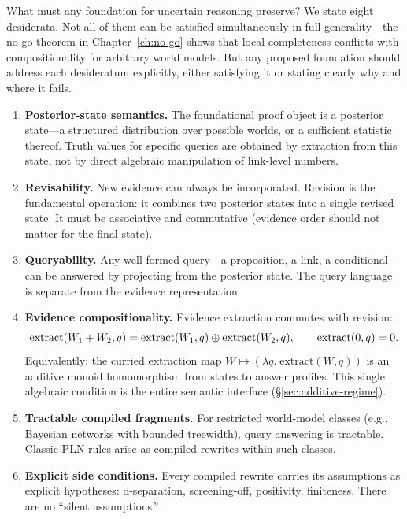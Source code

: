 \documentclass[11pt,openany]{report}
\begin{document}
What must any foundation for uncertain reasoning preserve?  We state
eight desiderata.  Not all of them can be satisfied simultaneously in
full generality---the no-go theorem in Chapter~\ref{ch:no-go} shows
that local completeness conflicts with compositionality for arbitrary
world models.  But any proposed foundation should address each
desideratum explicitly, either satisfying it or stating clearly why and
where it fails.

\begin{enumerate}
\item \textbf{Posterior-state semantics.}  The foundational proof
  object is a posterior state---a structured distribution over possible
  worlds, or a sufficient statistic thereof.  Truth values for specific
  queries are obtained by extraction from this state, not by direct
  algebraic manipulation of link-level numbers.

\item \textbf{Revisability.}  New evidence can always be incorporated.
  Revision is the fundamental operation: it combines two posterior
  states into a single revised state.  It must be associative and
  commutative (evidence order should not matter for the final state).

\item \textbf{Queryability.}  Any well-formed query---a proposition, a
  link, a conditional---can be answered by projecting from the
  posterior state.  The query language is separate from the evidence
  representation.

\item \textbf{Evidence compositionality.}  Evidence extraction commutes
  with revision:
  \[
    \mathrm{extract}(W_1 + W_2, q) = \mathrm{extract}(W_1, q) \oplus
    \mathrm{extract}(W_2, q), \qquad \mathrm{extract}(0, q) = 0.
  \]
  Equivalently: the curried extraction map
  $W \mapsto (\lambda q.\;\mathrm{extract}(W,q))$ is an additive
  monoid homomorphism from states to answer profiles.  This single
  algebraic condition is the entire semantic interface
  (\S\ref{sec:additive-regime}).

\item \textbf{Tractable compiled fragments.}  For restricted
  world-model classes (e.g., Bayesian networks with bounded treewidth),
  query answering is tractable.  Classic PLN rules arise as compiled
  rewrites within such classes.

\item \textbf{Explicit side conditions.}  Every compiled rewrite
  carries its assumptions as explicit hypotheses: d-separation,
  screening-off, positivity, finiteness.  There are no ``silent
  assumptions.''


\end{enumerate}
\end{document}
